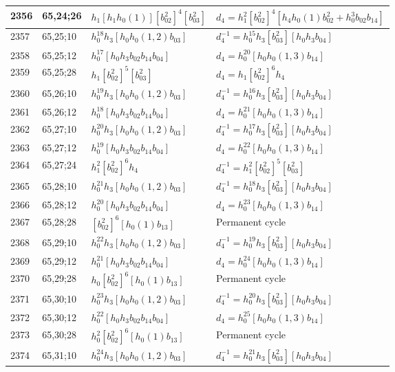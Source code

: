 \documentclass{article}
\begin{document}
\begin{longtable}{|l|l|>{\raggedright\arraybackslash}p{6cm}|>{\raggedright\arraybackslash}p{6cm}|}
\hline
2356 & 65,24;26 & $h_1[h_1h_0(1)][b_{02}^2]^4[b_{03}^2]$ &$d_{4}=h_1^2[b_{02}^2]^4[h_4h_0(1)b_{02}^2 + h_0^3b_{02}b_{14}]$\\
\hline
2357 & 65,25;10 & $h_0^{18}h_3[h_0h_0(1, 2)b_{03}]$ & $d_{4}^{-1}=h_0^{15}h_3[b_{03}^2][h_0h_3b_{04}]$\\
\hline
2358 & 65,25;12 & $h_0^{17}[h_0h_3b_{02}b_{14}b_{04}]$ &$d_{4}=h_0^{20}[h_0h_0(1, 3)b_{14}]$\\
\hline
2359 & 65,25;28 & $h_1[b_{02}^2]^5[b_{03}^2]$ &$d_{4}=h_1[b_{02}^2]^6h_4$\\
\hline
2360 & 65,26;10 & $h_0^{19}h_3[h_0h_0(1, 2)b_{03}]$ & $d_{4}^{-1}=h_0^{16}h_3[b_{03}^2][h_0h_3b_{04}]$\\
\hline
2361 & 65,26;12 & $h_0^{18}[h_0h_3b_{02}b_{14}b_{04}]$ &$d_{4}=h_0^{21}[h_0h_0(1, 3)b_{14}]$\\
\hline
2362 & 65,27;10 & $h_0^{20}h_3[h_0h_0(1, 2)b_{03}]$ & $d_{4}^{-1}=h_0^{17}h_3[b_{03}^2][h_0h_3b_{04}]$\\
\hline
2363 & 65,27;12 & $h_0^{19}[h_0h_3b_{02}b_{14}b_{04}]$ &$d_{4}=h_0^{22}[h_0h_0(1, 3)b_{14}]$\\
\hline
2364 & 65,27;24 & $h_1^2[b_{02}^2]^6h_4$ & $d_{4}^{-1}=h_1^2[b_{02}^2]^5[b_{03}^2]$\\
\hline
2365 & 65,28;10 & $h_0^{21}h_3[h_0h_0(1, 2)b_{03}]$ & $d_{4}^{-1}=h_0^{18}h_3[b_{03}^2][h_0h_3b_{04}]$\\
\hline
2366 & 65,28;12 & $h_0^{20}[h_0h_3b_{02}b_{14}b_{04}]$ &$d_{4}=h_0^{23}[h_0h_0(1, 3)b_{14}]$\\
\hline
2367 & 65,28;28 & $[b_{02}^2]^6[h_0(1)b_{13}]$ & Permanent cycle\\
\hline
2368 & 65,29;10 & $h_0^{22}h_3[h_0h_0(1, 2)b_{03}]$ & $d_{4}^{-1}=h_0^{19}h_3[b_{03}^2][h_0h_3b_{04}]$\\
\hline
2369 & 65,29;12 & $h_0^{21}[h_0h_3b_{02}b_{14}b_{04}]$ &$d_{4}=h_0^{24}[h_0h_0(1, 3)b_{14}]$\\
\hline
2370 & 65,29;28 & $h_0[b_{02}^2]^6[h_0(1)b_{13}]$ & Permanent cycle\\
\hline
2371 & 65,30;10 & $h_0^{23}h_3[h_0h_0(1, 2)b_{03}]$ & $d_{4}^{-1}=h_0^{20}h_3[b_{03}^2][h_0h_3b_{04}]$\\
\hline
2372 & 65,30;12 & $h_0^{22}[h_0h_3b_{02}b_{14}b_{04}]$ &$d_{4}=h_0^{25}[h_0h_0(1, 3)b_{14}]$\\
\hline
2373 & 65,30;28 & $h_0^2[b_{02}^2]^6[h_0(1)b_{13}]$ & Permanent cycle\\
\hline
2374 & 65,31;10 & $h_0^{24}h_3[h_0h_0(1, 2)b_{03}]$ & $d_{4}^{-1}=h_0^{21}h_3[b_{03}^2][h_0h_3b_{04}]$\\

\end{longtable}
\end{document}
